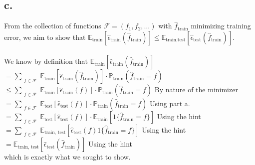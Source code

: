 \documentclass{article}
\newcommand{\1}{\mathbf{1}}
\newcommand{\E}{\mathbb{E}}
\renewcommand{\P}{\mathbb{P}}
\begin{document}
{\subsection*{c.}
From the collection of functions $\mathcal{F} = (f_1, f_2, \dots)$ with $\widehat{f}_{\text{train}}$ minimizing training error, we aim to show that $\E_{\text{train}}[\widehat{\epsilon}_{\text{train}}(\widehat{f}_{\text{train}})] \leq \E_{\text{train,test}}[\widehat{\epsilon}_{\text{test}}(\widehat{f}_{\text{train}})]$. \\ \\
We know by definition that $\E_{\text{train}}[\widehat{\epsilon}_{\text{train}}(\widehat{f}_{\text{train}})] $ \\ 
$= \sum\limits_{\substack{f \in \mathcal{F}}} \E_{\text{train}}[\widehat{\epsilon}_{\text{train}}(\widehat{f}_{\text{train}})] \cdot \P_{\text{train}}(\widehat{f}_{\text{train}} = f)$ \\
$\leq \sum\limits_{\substack{f \in \mathcal{F}}} \E_{\text{train}}[\widehat{\epsilon}_{\text{train}}(f)] \cdot \P_{\text{train}}(\widehat{f}_{\text{train}} = f)$ \hfill By nature of the minimizer \\
$= \sum\limits_{\substack{f \in \mathcal{F}}} \E_{\text{test}}[\widehat{\epsilon}_{\text{test}}(f)] \cdot \P_{\text{train}}(\widehat{f}_{\text{train}} = f)$ \hfill Using part a. \\
$= \sum\limits_{\substack{f \in \mathcal{F}}} \E_{\text{test}}[\widehat{\epsilon}_{\text{test}}(f)] \cdot \E_{\text{train}}[1\{\widehat{f}_{\text{train}} = f\}]$ \hfill Using the hint \\
$= \sum\limits_{\substack{f \in \mathcal{F}}} \E_{\text{train, test}}[\widehat{\epsilon}_{\text{test}}(f)1\{\widehat{f}_{\text{train}} = f\}]$ \hfill Using the hint \\
$= \E_{\text{train, test}}[\widehat{\epsilon}_{\text{test}}(\widehat{f}_{\text{train}})]$ \hfill Using the hint \\ 
which is exactly what we sought to show.
\newpage
}
\end{document}
